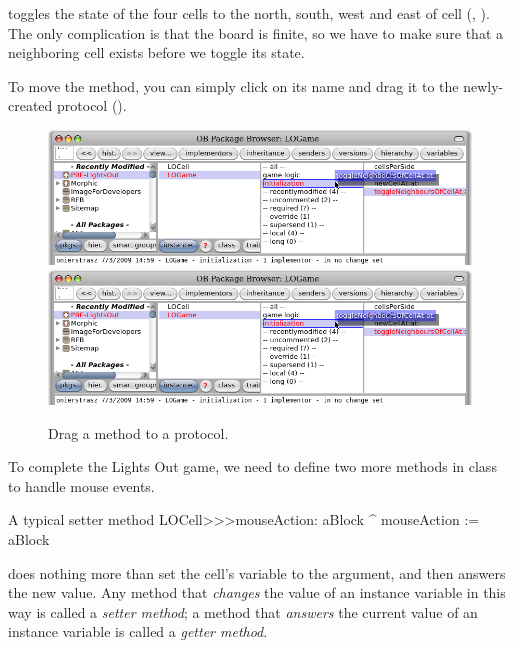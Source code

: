 \documentclass[a4paper,10pt,twoside]{book}
\begin{document}
 toggles the state of the four cells to the north, south, west and east of cell (, ).  The only complication is that the board is finite, so we have to make sure that a neighboring cell exists before we toggle its state.

To move the method, you can simply click on its name and drag it to the newly-created protocol ().

\begin{figure}[htbp]
   \centering
   \ifluluelse
		{\includegraphics[width=\textwidth]{DragMethod} }
		{\includegraphics[scale=0.7]{DragMethod} }
   \caption{Drag a method to a protocol.\label{fig:dragMethod}}
\end{figure}

To complete the Lights Out game, we need to define two more methods in class  to handle mouse events.
\begin{method}[mouseAction:]{A typical setter method}
LOCell>>>mouseAction: aBlock
   ^ mouseAction := aBlock
\end{method}

 does nothing more than set the cell's  variable to the argument, and then answers the new value.
Any method that \emph{changes} the value of an instance variable in this way is called a \emph{setter method}; a method that \emph{answers} the current value of an instance variable is called a \emph{getter method}.
\end{document}
